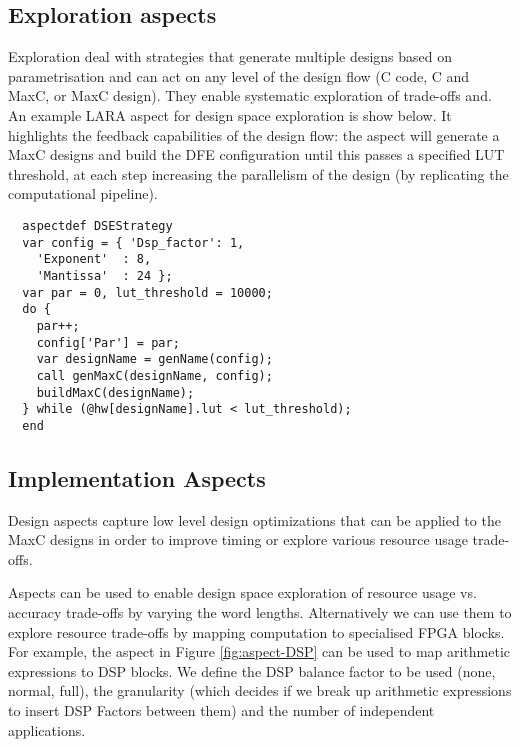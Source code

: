 \subsection{Exploration aspects}

Exploration deal with strategies that generate multiple designs based
on parametrisation and can act on any level of the design flow (C
code, C and MaxC, or MaxC design). They enable systematic exploration
of trade-offs and. An example LARA aspect for design space exploration
is show below. It highlights the feedback capabilities of the design
flow: the aspect will generate a MaxC designs and build the DFE
configuration until this passes a specified LUT threshold, at each
step increasing the parallelism of the design (by replicating the
computational pipeline).

\lstset{style=lara}
\begin{lstlisting}
  aspectdef DSEStrategy
  var config = { 'Dsp_factor': 1,
    'Exponent'  : 8,
    'Mantissa'  : 24 };
  var par = 0, lut_threshold = 10000;
  do {
    par++;
    config['Par'] = par;
    var designName = genName(config);
    call genMaxC(designName, config);
    buildMaxC(designName);
  } while (@hw[designName].lut < lut_threshold);
  end
\end{lstlisting}

\subsection{Implementation Aspects}

Design aspects capture low level design optimizations that can be
applied to the MaxC designs in order to improve timing or explore
various resource usage trade-offs.

Aspects can be used to enable design space exploration of resource
usage vs. accuracy trade-offs by varying the word
lengths. Alternatively we can use them to explore resource trade-offs
by mapping computation to specialised FPGA blocks. For example, the
aspect in Figure \ref{fig:aspect-DSP} can be used to map arithmetic
expressions to DSP blocks. We define the DSP balance factor to be used
(none, normal, full), the granularity (which decides if we break up
arithmetic expressions to insert DSP Factors between them) and the
number of independent applications.

